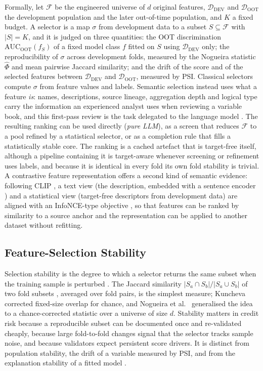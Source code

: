 \documentclass[final,5p,twocolumn]{elsarticle}
\newcommand{\Kfeat}{K}
\newcommand{\AUC}{\mathrm{AUC}}
\begin{document}
Formally, let $\mathcal{F}$ be the engineered universe of $d$ original features, $\mathcal{D}_{\mathrm{DEV}}$ and $\mathcal{D}_{\mathrm{OOT}}$ the development population and the later out-of-time population, and $\Kfeat$ a fixed budget. A selector is a map $\sigma$ from development data to a subset $S\subseteq\mathcal{F}$ with $|S|=\Kfeat$, and it is judged on three quantities: the OOT discrimination $\AUC_{\mathrm{OOT}}(f_S)$ of a fixed model class $f$ fitted on $S$ using $\mathcal{D}_{\mathrm{DEV}}$ only; the reproducibility of $\sigma$ across development folds, measured by the Nogueira statistic $\hat\Phi$ and mean pairwise Jaccard similarity; and the drift of the score and of the selected features between $\mathcal{D}_{\mathrm{DEV}}$ and $\mathcal{D}_{\mathrm{OOT}}$, measured by PSI. Classical selectors compute $\sigma$ from feature values and labels. Semantic selection instead uses what a feature \emph{is}: names, descriptions, source lineage, aggregation depth and logical type carry the information an experienced analyst uses when reviewing a variable book, and this first-pass review is the task delegated to the language model \cite{jeong2025,li2025sigkdd}. The resulting ranking can be used directly (\emph{pure LLM}), as a screen that reduces $\mathcal{F}$ to a pool refined by a statistical selector, or as a completion rule that fills a statistically stable core. The ranking is a cached artefact that is target-free itself, although a pipeline containing it is target-aware whenever screening or refinement uses labels, and because it is identical in every fold its own fold stability is trivial. A contrastive feature representation offers a second kind of semantic evidence: following CLIP \cite{radford2021}, a text view (the description, embedded with a sentence encoder \cite{reimers2019,wang2020minilm}) and a statistical view (target-free descriptors from development data) are aligned with an InfoNCE-type objective \cite{oord2018}, so that features can be ranked by similarity to a source anchor and the representation can be applied to another dataset without refitting.

\subsection{Feature-Selection Stability}
\label{subsec:fs_stability_background}

Selection stability is the degree to which a selector returns the same subset when the training sample is perturbed \cite{kalousis2007}. The Jaccard similarity $|S_a\cap S_b|/|S_a\cup S_b|$ of two fold subsets \cite{jaccard1901}, averaged over fold pairs, is the simplest measure; Kuncheva \cite{kuncheva2007} corrected fixed-size overlap for chance, and Nogueira et al.\ \cite{nogueira2018} generalised the idea to a chance-corrected statistic over a universe of size $d$. Stability matters in credit risk because a reproducible subset can be documented once and re-validated cheaply, because large fold-to-fold changes signal that the selector tracks sample noise, and because validators expect persistent score drivers. It is distinct from population stability, the drift of a variable measured by PSI, and from the explanation stability of a fitted model \cite{ballegeer2025}.
\end{document}
